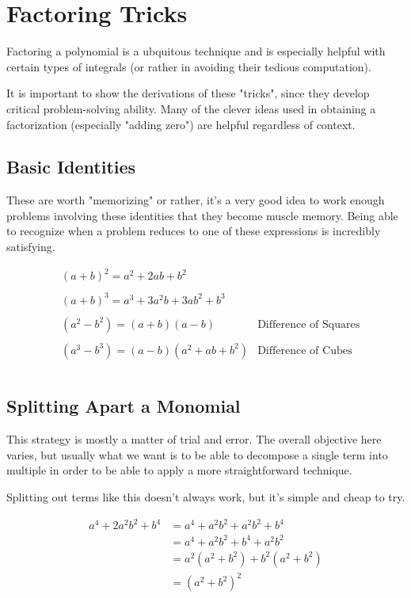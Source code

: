 \documentclass{standalone}
\begin{document}
\section{Factoring Tricks}

Factoring a polynomial is a ubquitous technique and is especially helpful with
certain types of integrals (or rather in avoiding their tedious computation).

It is important to show the derivations of these "tricks", since they develop
critical problem-solving ability. Many of the clever ideas used in obtaining a
factorization (especially "adding zero") are helpful regardless of context.

\subsection{Basic Identities}

These are worth "memorizing" or rather, it's a very good idea to work enough
problems involving these identities that they become muscle memory. Being able
to recognize when a problem reduces to one of these expressions is incredibly
satisfying.

\begin{align*}
  &(a + b)^2 = a^2 + 2ab + b^2 \\\\
  &(a + b)^3 = a^3 + 3a^2b + 3ab^2 + b^3 \\\\
  &(a^2 - b^2) = (a + b)(a - b)           &\text{Difference of Squares} \\\\
  &(a^3 - b^3) = (a - b)(a^2 + ab + b^2)  &\text{Difference of Cubes} \\\\
\end{align*}

\subsection{Splitting Apart a Monomial}

This strategy is mostly a matter of trial and error. The overall objective here
varies, but usually what we want is to be able to decompose a single term into
multiple in order to be able to apply a more straightforward technique.

Splitting out terms like this doesn't always work, but it's simple and cheap to
try.

\begin{align*}
  a^4 + 2a^2b^2 + b^4
  &= a^4 + a^2b^2 + a^2b^2 + b^4 \\
  &= a^4 + a^2b^2 + b^4 + a^2b^2 \\
  &= a^2(a^2 + b^2) + b^2(a^2 + b^2) \\
  &= (a^2 + b^2)^2
\end{align*}
\end{document}
